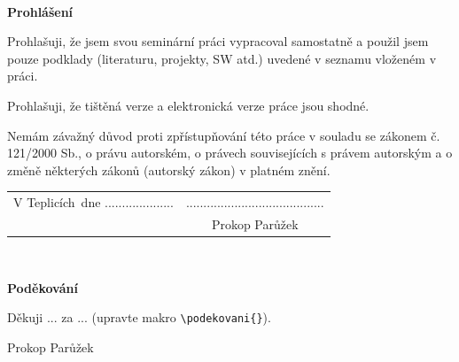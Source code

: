 \documentclass[a4paper,twoside,12pt]{book}
\newcommand{\tb}{\textbf} %
\newcommand{\woman}{} %
\newcommand{\autor}{Prokop Parůžek}   %
\newcommand{\kde}{Teplicích} %
\newcommand{\prohlaseni}{Prohlašuji, že jsem svou seminární práci vypracoval\woman{} samostatně a použil\woman{} jsem pouze podklady (literaturu, projekty, SW atd.) uvedené v seznamu vloženém v práci. 

Prohlašuji, že tištěná verze a elektronická verze práce jsou shodné. 

Nemám závažný důvod proti zpřístupňování této práce v souladu se zákonem č. 121/2000 Sb., o právu autorském, o právech souvisejících s právem autorským a o změně některých zákonů (autorský zákon) v platném znění. } %
\newcommand{\podekovani}{Děkuji ... za ... (upravte makro {\texttt{\textbackslash podekovani\{\}}}).} %
\begin{document}
\newpage %
\thispagestyle{empty}  %

~ %
\vfill %

\tb{Prohlášení} %

\vspace{1em} %
\prohlaseni

\vspace{2em}  %
\hspace{-0.5em}\begin{tabularx}{\textwidth}{X c}  %
V \kde\ dne .................... &........................................ \\	%
	& \autor
\end{tabularx}	%


\newpage
\thispagestyle{empty}

~
\vfill %


\tb{Poděkování}

\vspace{1em} %
\podekovani
\begin{flushright}
\autor
\end{flushright}  %


\newpage   %
\thispagestyle{empty}   %

\newbox\odstavecbox
\newlength\vyskaodstavce
\newcommand\odstavec[2]{%
	\setbox\odstavecbox=\hbox{%
		 \parbox[t]{#1}{#2\vrule width 0pt depth 4pt}}%
	\global\vyskaodstavce=\dp\odstavecbox
	\box\odstavecbox}
\newcommand{\delka}{120mm} %
\end{document}
